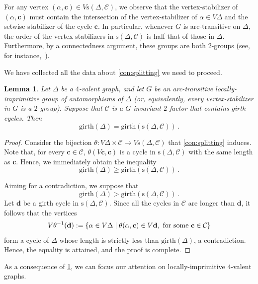 \documentclass[a4paper]{amsart}
\newcommand{\g}{\mathrm{girth}}
\newcommand{\0}{\mathbf{0}}
\newtheorem{lemma}[thm]{Lemma}
\theoremstyle{definition}
\begin{document}
    For any vertex $(\alpha,\mathbf{c}) \in V\mathrm{s}(\Delta,\mathcal{C})$, we observe that the vertex-stabilizer of $(\alpha,\mathbf{c})$ must contain the intersection of the vertex-stabilizer of $\alpha \in V\Delta$ and the setwise stabilizer of the cycle $\mathbf{c}$. In particular, whenever $G$ is arc-transitive on $\Delta$, the order of the vertex-stabilizers in $\mathrm{s}(\Delta,\mathcal{C})$ is half that of those in $\Delta$. Furthermore, by a connectedness argument, these groups are both $2$-groups (see, for instance,~\cite[Lemma~3.1]{Spiga2014}).

    We have collected all the data about \cref{con:splitting} we need to proceed.
    
   \begin{lemma}\label{lemma:girthSplit}
            Let $\Delta$ be a $4$-valent graph, and let $G$ be an arc-transitive locally-imprimitive group of automorphisms of $\Delta$ (or, equivalently, every vertex-stabilizer in $G$ is a $2$-group). Suppose that $\mathcal{C}$ is a $G$-invariant $2$-factor that contains girth cycles. Then
            \[ \g (\Delta) = \g \left( \mathrm{s}(\Delta, \mathcal{C})\right) \,. \]
        \end{lemma}
    \begin{proof}
    Consider the bijection $\theta: V\Delta \times \mathcal{C} \to V\mathrm{s}(\Delta, \mathcal{C})$ that \cref{con:splitting} induces. Note that, for every $\mathbf{c} \in \mathcal{C}$, $\theta(V\mathbf{c},\mathbf{c})$ is a cycle in $\mathrm{s}(\Delta,\mathcal{C})$ with the same length as $\mathbf{c}$. Hence, we immediately obtain the inequality
    \[ \mathrm{girth} (\Delta) \ge \mathrm{girth} \left( \mathrm{s}(\Delta, \mathcal{C})\right) \,. \]
    
    Aiming for a contradiction, we suppose that
    \[ \mathrm{girth} (\Delta) > \mathrm{girth} \left( \mathrm{s}(\Delta, \mathcal{C})\right) \,. \]
    Let $\mathbf{d}$ be a girth cycle in $\mathrm{s}(\Delta, \mathcal{C})$. Since all the cycles in $\mathcal{C}$ are longer than $\mathbf{d}$, it follows that the vertices
    \[ V\theta^{-1}(\mathbf{d}) := \{ \alpha \in V\Delta \mid \theta(\alpha,\mathbf{c}) \in V\mathbf{d}, \hbox{ for some }\mathbf{c}\in \mathcal{C} \}\]
    form a cycle of $\Delta$ whose length is strictly less than $\mathrm{girth}(\Delta)$, a contradiction. Hence, the equality is attained, and the proof is complete.
    \end{proof}

As a consequence of \cref{lemma:girthSplit}, we can focus our attention on locally-imprimitive $4$-valent graphs.
    
\end{document}
